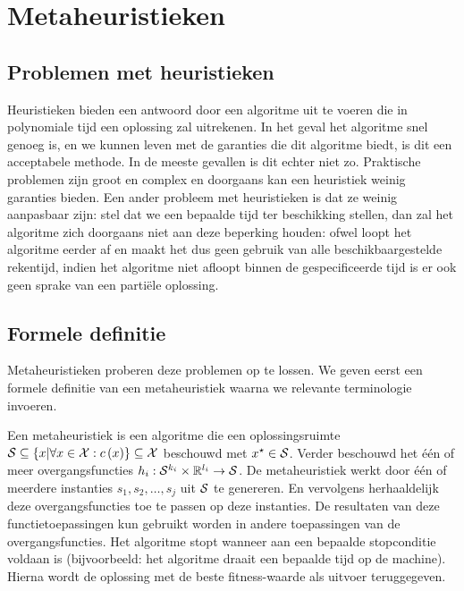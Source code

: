 

\section{Metaheuristieken}

\subsection{Problemen met heuristieken}

Heuristieken bieden een antwoord door een algoritme uit te voeren die in polynomiale tijd een oplossing zal uitrekenen. In het geval het algoritme snel genoeg is, en we kunnen leven met de garanties die dit algoritme biedt, is dit een acceptabele methode. In de meeste gevallen is dit echter niet zo. Praktische problemen zijn groot en complex en doorgaans kan een heuristiek weinig garanties bieden. Een ander probleem met heuristieken is dat ze weinig aanpasbaar zijn: stel dat we een bepaalde tijd ter beschikking stellen, dan zal het algoritme zich doorgaans niet aan deze beperking houden: ofwel loopt het algoritme eerder af en maakt het dus geen gebruik van alle beschikbaargestelde rekentijd, indien het algoritme niet afloopt binnen de gespecificeerde tijd is er ook geen sprake van een parti\"ele oplossing.

\subsection{Formele definitie}

Metaheuristieken proberen deze problemen op te lossen. We geven eerst een formele definitie van een metaheuristiek waarna we relevante terminologie invoeren.

\begin{definition}[Metaheuristiek]
Een metaheuristiek is een algoritme die een oplossingsruimte $\mathcal{S}\subseteq\left\{ x|\forall x\in \mathcal{X}:c\left(x\right)\right\}\subseteq\mathcal{X}$ beschouwd met $x^{\star}\in\mathcal{S}$. Verder beschouwd het \'e\'en of meer overgangsfuncties $h_i:\mathcal{S}^{k_i}\times\mathbb{R}^{l_i}\rightarrow\mathcal{S}$. De metaheuristiek werkt door \'e\'en of meerdere instanties $s_1,s_2,\ldots,s_j$ uit $\mathcal{S}$ te genereren. En vervolgens herhaaldelijk deze overgangsfuncties toe te passen op deze instanties. De resultaten van deze functietoepassingen kun gebruikt worden in andere toepassingen van de overgangsfuncties. Het algoritme stopt wanneer aan een bepaalde stopconditie voldaan is (bijvoorbeeld: het algoritme draait een bepaalde tijd op de machine). Hierna wordt de oplossing met de beste fitness-waarde als uitvoer teruggegeven.
\end{definition}

